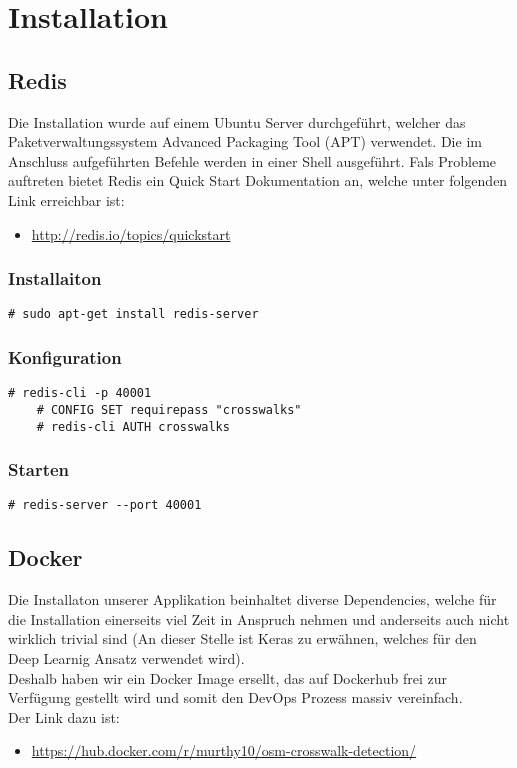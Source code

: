 \section{Installation}
\subsection{Redis}
\label{subsec:redis}
Die Installation wurde auf einem Ubuntu Server durchgeführt, welcher das Paketverwaltungssystem Advanced Packaging Tool (APT) verwendet. Die im Anschluss aufgeführten Befehle werden in einer Shell ausgeführt.
Fals Probleme auftreten bietet Redis ein Quick Start Dokumentation an, welche unter  folgenden Link erreichbar ist:
\begin{itemize}
	\item \url{http://redis.io/topics/quickstart}
\end{itemize}

\subsubsection{Installaiton}
\begin{lstlisting}[style=BashInputStyle]
	# sudo apt-get install redis-server
\end{lstlisting}

\subsubsection{Konfiguration}
\begin{lstlisting}[style=BashInputStyle]
	# redis-cli -p 40001
	# CONFIG SET requirepass "crosswalks"
	# redis-cli AUTH crosswalks
\end{lstlisting}

\subsubsection{Starten}
\begin{lstlisting}[style=BashInputStyle]
	# redis-server --port 40001
\end{lstlisting}

\newpage

\subsection{Docker}
\label{subsec:docker}
Die Installaton unserer Applikation beinhaltet diverse Dependencies, welche für die Installation einerseits viel Zeit in Anspruch nehmen und anderseits auch nicht wirklich trivial sind (An dieser Stelle ist Keras zu erwähnen, welches für den Deep Learnig Ansatz verwendet wird). \\
Deshalb haben wir ein Docker Image ersellt, das auf Dockerhub frei zur Verfügung gestellt wird und somit den DevOps Prozess massiv vereinfach.\\
Der Link dazu ist:
\begin{itemize}
	\item \url{https://hub.docker.com/r/murthy10/osm-crosswalk-detection/}
\end{itemize}

